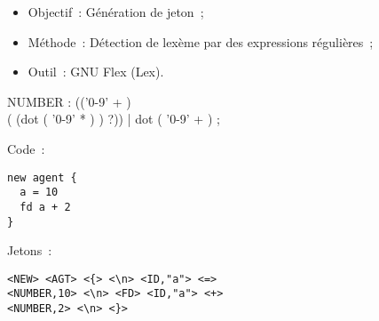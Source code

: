 \begin{frame}
	\begin{itemize}
		\item Objectif~: Génération de jeton~;
		\item Méthode~: Détection de lexème par des expressions régulières~;
		\item Outil~: GNU Flex (Lex).
	\end{itemize}
\end{frame}

\begin{frame}[fragile]
	\begin{rail}
		NUMBER : (('0-9' + ) \\ ( (dot ( '0-9' * ) ) ?))
		| dot ( '0-9' + ) ;
	\end{rail}
\end{frame}

\begin{frame}[fragile]
	Code~:
	\begin{lstlisting}[language=Stibbons]
new agent {
  a = 10
  fd a + 2
}
	\end{lstlisting}
	Jetons~:
	\begin{lstlisting}[breaklines]
<NEW> <AGT> <{> <\n> <ID,"a"> <=> 
<NUMBER,10> <\n> <FD> <ID,"a"> <+> 
<NUMBER,2> <\n> <}>
	\end{lstlisting}
\end{frame}
